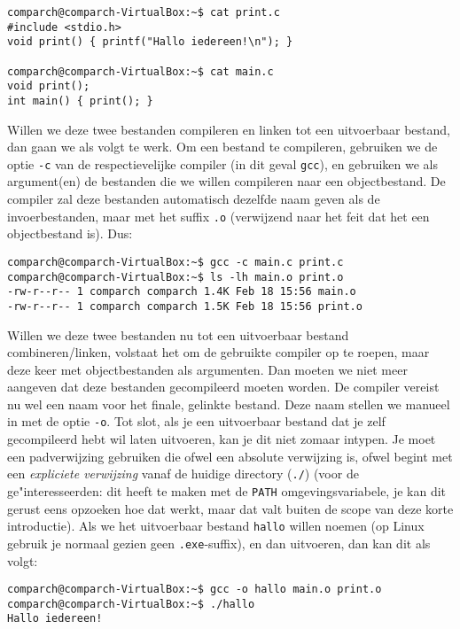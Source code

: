 \documentclass[a4paper,twoside,openany]{memoir}
\begin{document}
\begin{verbatim}
comparch@comparch-VirtualBox:~$ cat print.c
#include <stdio.h>
void print() { printf("Hallo iedereen!\n"); }

comparch@comparch-VirtualBox:~$ cat main.c
void print();
int main() { print(); }
\end{verbatim}

Willen we deze twee bestanden compileren en linken tot een uitvoerbaar bestand,
dan gaan we als volgt te werk. Om een bestand te compileren, gebruiken we de
optie \verb!-c! van de respectievelijke compiler (in dit geval \verb!gcc!), en
gebruiken we als argument(en) de bestanden die we willen compileren naar een
objectbestand. De compiler zal deze bestanden automatisch dezelfde naam geven
als de invoerbestanden, maar met het suffix \verb!.o! (verwijzend naar het feit
dat het een objectbestand is). Dus:

\begin{verbatim}
comparch@comparch-VirtualBox:~$ gcc -c main.c print.c 
comparch@comparch-VirtualBox:~$ ls -lh main.o print.o 
-rw-r--r-- 1 comparch comparch 1.4K Feb 18 15:56 main.o
-rw-r--r-- 1 comparch comparch 1.5K Feb 18 15:56 print.o
\end{verbatim}

Willen we deze twee bestanden nu tot een uitvoerbaar bestand combineren/linken,
volstaat het om de gebruikte compiler op te roepen, maar deze keer met
objectbestanden als argumenten. Dan moeten we niet meer aangeven dat deze
bestanden gecompileerd moeten worden. De compiler vereist nu wel een naam voor
het finale, gelinkte bestand. Deze naam stellen we manueel in met de optie
\verb!-o!. Tot slot, als je een uitvoerbaar bestand dat je zelf gecompileerd
hebt wil laten uitvoeren, kan je dit niet zomaar intypen. Je moet een
padverwijzing gebruiken die ofwel een absolute verwijzing is, ofwel begint met
een \emph{expliciete verwijzing} vanaf de huidige directory (\verb!./!) (voor de
ge"interesseerden: dit heeft te maken met de \verb!PATH! omgevingsvariabele, je
kan dit gerust eens opzoeken hoe dat werkt, maar dat valt buiten de scope van
deze korte introductie). Als we het uitvoerbaar bestand \verb!hallo! willen
noemen (op Linux gebruik je normaal gezien geen \verb!.exe!-suffix), en dan
uitvoeren, dan kan dit als volgt:

\begin{verbatim}
comparch@comparch-VirtualBox:~$ gcc -o hallo main.o print.o
comparch@comparch-VirtualBox:~$ ./hallo 
Hallo iedereen!
\end{verbatim}
\end{document}
